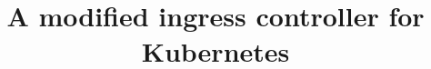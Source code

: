 \documentclass[letterpaper,twocolumn,10pt]{article}
\begin{document}
\date{}



\title{\Large \bf A modified ingress controller for Kubernetes}



\maketitle












\balance
{\footnotesize 
}


\end{document}
